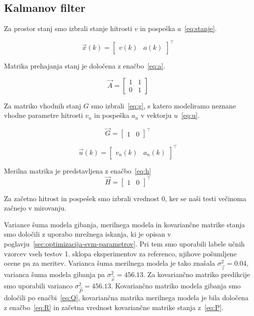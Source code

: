 \subsection{Kalmanov filter}\label{sec:implementacija-kalman}
Za prostor stanj smo izbrali stanje hitrosti $v$ in pospeška $a$~\eqref{eq:stanje}. 

\begin{equation}
\vec{x}(k) = \begin{bmatrix}
					v(k) & a(k)
				\end{bmatrix}^\top 
                \label{eq:stanje}
\end{equation}

Matrika prehajanja stanj je določena z enačbo~\eqref{eq:a}.

\begin{equation}
\vec{A} = \begin{bmatrix}
				1 & 1 \\
                0 & 1
			\end{bmatrix} 
            \label{eq:a}
\end{equation}

Za matriko vhodnih stanj $G$ smo izbrali~\eqref{eq:g}, s katero modeliramo neznane vhodne parametre hitrosti $v_n$ in pospeška $a_n$ v vektorju $u$~\eqref{eq:u}. 

\begin{equation}
\vec{G} = \begin{bmatrix}
				1 & 0
			\end{bmatrix}^\top 
            \label{eq:g}
\end{equation}

\begin{equation}
\vec{u}(k) = \begin{bmatrix}
					v_{n}(k) & a_n(k)
				\end{bmatrix}^\top 
                \label{eq:u}
\end{equation}


Merilna matrika je predstavljena z enačbo~\eqref{eq:h}
\begin{equation}
\vec{H} = \begin{bmatrix}
				1 & 0
			\end{bmatrix}^\top 
            \label{eq:h}
\end{equation}

Za začetno hitrost in pospešek smo izbrali vrednost $0$, ker se naši testi večinoma začnejo v mirovanju. 

Variance šuma modela gibanja, merilnega modela in kovariančne matrike stanja smo določili z uporabo mrežnega iskanja, ki je opisan v poglavju~\ref{sec:optimizacija-svm-parametrov}. Pri tem smo uporabili labele učnih vzorcev vseh testov 1. sklopa eksperimentov za referenco, njihove pošumljene ocene pa za meritev. Varianca šuma merilnega modela je tako znašala $\sigma_\vec{z}^2 = 0.04$, varianca šuma modela gibanja pa $\sigma_\vec{x}^2 = 456.13$. Za kovariančno matriko predikcije smo uporabili varianco $\sigma_\vec{P}^2 = 456.13$. Kovariančno matriko modela gibanja smo določili po enačbi~\eqref{eq:Q}, kovariančna matrika merilnega modela je bila določena z enačbo~\eqref{eq:R} in začetna vrednost kovariančne matrike stanja z~\eqref{eq:P}.

